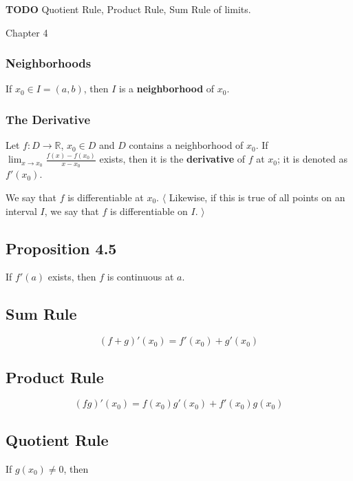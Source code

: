\documentclass[12pt,letterpaper]{article}
\newcommand{\R}{{\mathbb R}}
\newcommand{\btw}[1]{
    $\langle$ #1 $\rangle$
}
\newcommand{\TODO}{\color{red}\textbf{TODO}\color{black}}
\begin{document}
\begin{multicols*}{2}
        \TODO{} Quotient Rule, Product Rule, Sum Rule of limits.

        \newpage

        Chapter 4

        \subsubsection{Neighborhoods}

        If $x_0 \in I = (a, b)$, then $I$ is a {\bf neighborhood} of $x_0$.

        \subsubsection{The Derivative}

        Let $f: D \rightarrow \R$, $x_0 \in D$ and $D$ contains a neighborhood
        of $x_0$. If $\lim_{x \to x_0} \frac{f(x) - f(x_0)}{x - x_0}$ exists,
        then it is the {\bf derivative} of $f$ at $x_0$; it is denoted as
        $f'(x_0)$.

        We say that $f$ is differentiable at $x_0$. \btw { Likewise, if this is
        true of all points on an interval $I$, we say that $f$ is differentiable
        on $I$. }


        \subsection{Proposition 4.5}

        If $f'(a)$ exists, then $f$ is continuous at $a$.

        \subsection{Sum Rule}

        \[
          (f + g)'(x_0) = f'(x_0) + g'(x_0)
        \]

        \subsection{Product Rule}

        \[
          (fg)'(x_0) = f(x_0)g'(x_0) + f'(x_0)g(x_0)
        \]

        \subsection{Quotient Rule}

        If $g(x_0) \ne 0$, then


\end{multicols*}
\end{document}
